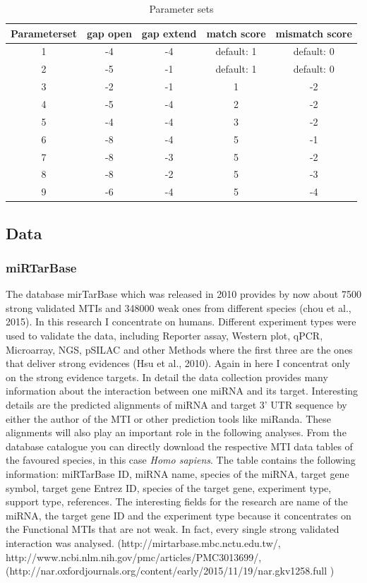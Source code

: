 \documentclass[12pt]{article}
\begin{document}
\begin{table}
\label{table:parameter}
\caption{Parameter sets}
\vspace{0.3cm}
\begin{tabular}{c|c|c|c|c}
Parameterset & gap open & gap extend & match score & mismatch score\\
\hline\hline 
1 & -4 & -4 & default: 1 & default: 0\\
2 & -5 & -1 & default: 1 & default: 0\\
3 & -2 & -1 & 1 & -2 \\
4 & -5 & -4 & 2 & -2 \\
5 & -4 & -4 & 3 & -2 \\
6 & -8 & -4 & 5 & -1 \\
7 & -8 & -3 & 5 & -2 \\
8 & -8 & -2 & 5 & -3 \\
9 & -6 & -4 & 5 & -4 \\
\hline
\end{tabular}
\end{table}

 
\subsection{Data} 
\subsubsection{miRTarBase}
The database mirTarBase which was released in 2010 provides by now about 7500 strong validated MTIs and 348000 weak ones from different species (chou et al., 2015). In this research I concentrate on humans. Different experiment types were used to validate the data, including Reporter assay, Western plot, qPCR, Microarray, NGS, pSILAC and other Methods where the first three are the ones that deliver strong evidences (Hsu et al., 2010). Again in here I concentrat only on the strong evidence targets. In detail the data collection provides many information about the interaction between one miRNA and its target. Interesting details are the predicted alignments of miRNA and target 3' UTR sequence by either the author of the MTI or other prediction tools like miRanda. These alignments will also play an important role in the following analyses. From the database catalogue you can directly download the respective MTI data tables of the favoured species, in this case \textit{Homo sapiens}. The table contains the following information: miRTarBase ID, miRNA name, species of the miRNA, target gene symbol, target gene Entrez ID, species of the target gene, experiment type, support type, references. The interesting fields for the research are name of the miRNA, the target gene ID and the experiment type because it concentrates on the Functional MTIs that are not weak. In fact, every single strong validated interaction was analysed. (http://mirtarbase.mbc.nctu.edu.tw/, http://www.ncbi.nlm.nih.gov/pmc/articles/PMC3013699/, (http://nar.oxfordjournals.org/content/early/2015/11/19/nar.gkv1258.full )
\end{document}
